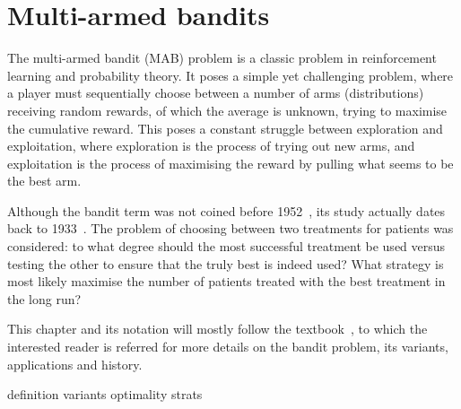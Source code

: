 \chapter{Multi-armed bandits}
\label{chap:bandits}

The multi-armed bandit (MAB) problem is a classic problem in reinforcement learning and probability theory.
It poses a simple yet challenging problem, where a player must sequentially choose between a number of arms (distributions) receiving random rewards, of which the average is unknown, trying to maximise the cumulative reward.
This poses a constant struggle between exploration and exploitation, where exploration is the process of trying out new arms, and exploitation is the process of maximising the reward by pulling what seems to be the best arm.

Although the bandit term was not coined before 1952~\autocite{robbins1952}, its study actually dates back to 1933~\autocite{thompson1933}.
The problem of choosing between two treatments for patients was considered: to what degree should the most successful treatment be used versus testing the other to ensure that the truly best is indeed used?
What strategy is most likely maximise the number of patients treated with the best treatment in the long run?

This chapter and its notation will mostly follow the textbook~\autocite{lattimore2020}, to which the interested reader is referred for more details on the bandit problem, its variants, applications and history.


{definition}
{variants}
{optimality}
{strats}

